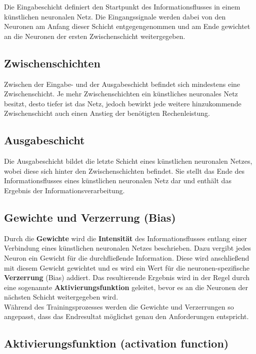 	Die Eingabeschicht definiert den Startpunkt des Informationsflusses in einem künstlichen neuronalen Netz. Die Eingangssignale werden dabei von den Neuronen am Anfang dieser Schicht entgegengenommen und am Ende gewichtet an die Neuronen der ersten Zwischenschicht weitergegeben. \cite{jaai}
	
\subsection{Zwischenschichten}

	Zwischen der Eingabe- und der Ausgabeschicht befindet sich mindestens eine Zwischenschicht. Je mehr Zwischenschichten ein künstliches neuronales Netz besitzt, desto tiefer ist das Netz, jedoch bewirkt jede weitere hinzukommende Zwischenschicht auch einen Anstieg der benötigten Rechenleistung. \cite{jaai}
	
\subsection{Ausgabeschicht}

	Die Ausgabeschicht bildet die letzte Schicht eines künstlichen neuronalen Netzes, wobei diese sich hinter den Zwischenschichten befindet. Sie stellt das Ende des Informationsflusses eines künstlichen neuronalen Netz dar und enthält das Ergebnis der Informationsverarbeitung. \cite{jaai}
	
\subsection{Gewichte und Verzerrung (Bias)}


	Durch die \textbf{Gewichte} wird die \textbf{Intensität} des Informationsflusses entlang einer Verbindung eines künstlichen neuronalen Netzes beschrieben. Dazu vergibt jedes Neuron ein Gewicht für die durchfließende Information. Diese wird anschließend mit diesem Gewicht gewichtet und es wird ein Wert für die neuronen-spezifische \textbf{Verzerrung} (Bias) addiert. Das resultierende Ergebnis wird in der Regel durch eine sogenannte \textbf{Aktivierungsfunktion} geleitet, bevor es an die Neuronen der nächsten Schicht weitergegeben wird. \cite{jaai} \\
	
	Während des Trainingsprozesses werden die Gewichte und Verzerrungen so angepasst, dass das Endresultat möglichst genau den Anforderungen entspricht. \cite{jaai}
	
\subsection{Aktivierungsfunktion (activation function)}

